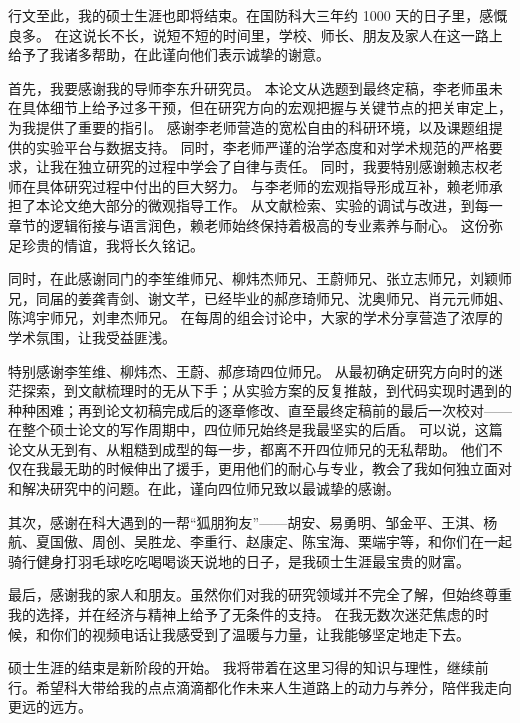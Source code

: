 
\begin{ack}
    行文至此，我的硕士生涯也即将结束。在国防科大三年约 1000 天的日子里，感慨良多。
    在这说长不长，说短不短的时间里，学校、师长、朋友及家人在这一路上给予了我诸多帮助，在此谨向他们表示诚挚的谢意。

    首先，我要感谢我的导师李东升研究员。
    本论文从选题到最终定稿，李老师虽未在具体细节上给予过多干预，但在研究方向的宏观把握与关键节点的把关审定上，为我提供了重要的指引。
    感谢李老师营造的宽松自由的科研环境，以及课题组提供的实验平台与数据支持。
    同时，李老师严谨的治学态度和对学术规范的严格要求，让我在独立研究的过程中学会了自律与责任。
    同时，我要特别感谢赖志权老师在具体研究过程中付出的巨大努力。
    与李老师的宏观指导形成互补，赖老师承担了本论文绝大部分的微观指导工作。
    从文献检索、实验的调试与改进，到每一章节的逻辑衔接与语言润色，赖老师始终保持着极高的专业素养与耐心。
    这份弥足珍贵的情谊，我将长久铭记。
    
    同时，在此感谢同门的李笙维师兄、柳炜杰师兄、王蔚师兄、张立志师兄，刘颖师兄，同届的姜龚青剑、谢文芊，已经毕业的郝彦琦师兄、沈奥师兄、肖元元师姐、陈鸿宇师兄，刘聿杰师兄。
    在每周的组会讨论中，大家的学术分享营造了浓厚的学术氛围，让我受益匪浅。

    特别感谢李笙维、柳炜杰、王蔚、郝彦琦四位师兄。
    从最初确定研究方向时的迷茫探索，到文献梳理时的无从下手；从实验方案的反复推敲，到代码实现时遇到的种种困难；再到论文初稿完成后的逐章修改、直至最终定稿前的最后一次校对——在整个硕士论文的写作周期中，四位师兄始终是我最坚实的后盾。
    可以说，这篇论文从无到有、从粗糙到成型的每一步，都离不开四位师兄的无私帮助。
    他们不仅在我最无助的时候伸出了援手，更用他们的耐心与专业，教会了我如何独立面对和解决研究中的问题。在此，谨向四位师兄致以最诚挚的感谢。
    
    其次，感谢在科大遇到的一帮“狐朋狗友”——胡安、易勇明、邹金平、王淇、杨航、夏国傲、周创、吴胜龙、李重行、赵康定、陈宝海、栗端宇等，和你们在一起骑行健身打羽毛球吃吃喝喝谈天说地的日子，是我硕士生涯最宝贵的财富。
    
    最后，感谢我的家人和朋友。虽然你们对我的研究领域并不完全了解，但始终尊重我的选择，并在经济与精神上给予了无条件的支持。
    在我无数次迷茫焦虑的时候，和你们的视频电话让我感受到了温暖与力量，让我能够坚定地走下去。
    
    硕士生涯的结束是新阶段的开始。
    我将带着在这里习得的知识与理性，继续前行。希望科大带给我的点点滴滴都化作未来人生道路上的动力与养分，陪伴我走向更远的远方。

\end{ack}
